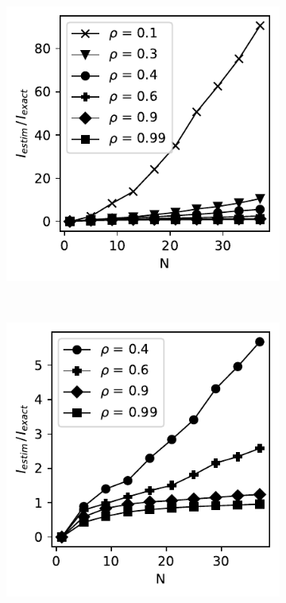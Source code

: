 \documentclass[../Thesis.tex]{subfiles}
\begin{document}
\begin{figure}[h]
    \centering
    \begin{subfigure}[t]{0.32\textwidth}
        \centering
        \includegraphics[width=\linewidth]{figures/ND examples/MI calc/gaussian example original all.pdf}
        \caption{}
        \label{subfig:d}
    \end{subfigure}%
    ~
    \begin{subfigure}[t]{0.32\textwidth}
        \centering
        \includegraphics[width=\linewidth]{figures/ND examples/MI calc/gaussian example original zoom.pdf}

\end{subfigure}
\end{figure}
\end{document}
